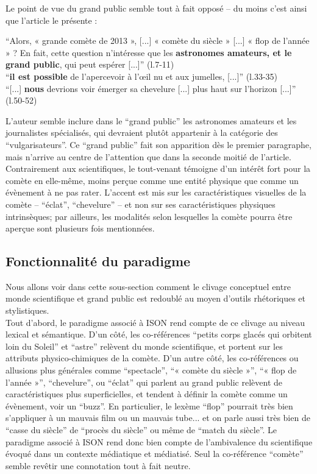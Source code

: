 \documentclass[a4paper,10pt]{article}
\begin{document}
			Le point de vue du grand public semble tout à fait opposé -- du moins c'est ainsi que l'article le présente :
			\begin{center}
				\footnotesize
				\begin{minipage}{0.7\textwidth}
					 ``Alors, « grande comète de 2013 », [...] « comète du siècle » [...] « flop de l'année » ? En fait, cette question n'intéresse que les \textbf{astronomes amateurs, et le grand public}, qui peut espérer [...]'' (l.7-11)\\
					 ``\textbf{il est possible} de l'apercevoir à l’œil nu et aux jumelles, [...]'' (l.33-35)\\
					 ``[...] \textbf{nous} devrions voir émerger sa chevelure [...] plus haut sur l'horizon [...]'' (l.50-52)
				\end{minipage}
			\end{center}
			L'auteur semble inclure dans le ``grand public'' les astronomes amateurs et les journalistes spécialisés, qui devraient plutôt appartenir à la catégorie des ``vulgarisateurs''. Ce ``grand public'' fait son apparition dès le premier paragraphe, mais n'arrive au centre de l'attention que dans la seconde moitié de l'article. Contrairement aux scientifiques, le tout-venant témoigne d'un intérêt fort pour la comète en elle-même, moins perçue comme une entité physique que comme un évènement à ne pas rater. L'accent est mis sur les caractéristiques visuelles de la comète  -- ``éclat'', ``chevelure'' --  et non sur ses caractéristiques physiques intrinsèques; par ailleurs, les modalités selon lesquelles la comète pourra être aperçue sont plusieurs fois mentionnées.
		\subsection{Fonctionnalité du paradigme}
			Nous allons voir dans cette sous-section comment le clivage conceptuel entre monde scientifique et grand public est redoublé au moyen d'outils rhétoriques et stylistiques.\\
			Tout d'abord, le paradigme associé à ISON rend compte de ce clivage au niveau lexical et sémantique. D'un côté, les co-références ``petits corps glacés qui orbitent loin du Soleil'' et ``astre'' relèvent du monde scientifique, et portent sur les attributs physico-chimiques de la comète. D'un autre côté, les co-références ou allusions plus générales comme ``spectacle'', ``« comète du siècle »'', ``« flop de l'année »'', ``chevelure'', ou ``éclat'' qui parlent au grand public relèvent de caractéristiques plus superficielles, et tendent à définir la comète comme un évènement, voir un ``buzz''. En particulier, le lexème ``flop'' pourrait très bien s'appliquer à un mauvais film ou un mauvais tube... et on parle aussi très bien de ``casse du siècle'' de ``procès du siècle'' ou même de ``match du siècle''. Le paradigme associé à ISON rend donc bien compte de l'ambivalence du scientifique évoqué dans un contexte médiatique et médiatisé. Seul la co-référence ``comète'' semble revêtir une connotation tout à fait neutre.\\
			
\end{document}
